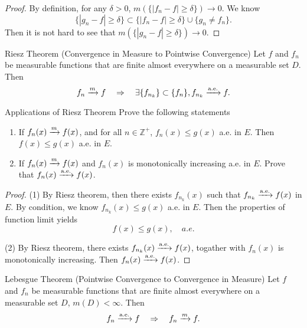 \begin{proof}
  By definition, for any $\delta > 0$, $m(\{|f_n - f| \geq \delta\}) \rightarrow 0$.
  We know
  \begin{equation}
    \{|g_n - f| \geq \delta \} \subset \{|f_n - f| \geq \delta\} \cup \{g_n \neq f_n\}.
  \end{equation}
  Then it is not hard to see that $m(\{|g_n - f| \geq \delta\}) \rightarrow 0$.
\end{proof}

\begin{theorem}{Riesz Theorem (Convergence in Measure to Pointwise Convergence)}{}
  Let $f$ and $f_n$ be measurable functions that are finite almost everywhere on
  a measurable set $D$. Then
  \begin{equation}
    f_n \xrightarrow{m} f \quad \Rightarrow \quad \exists \{f_{n_k}\} \subset \{f_n\}, f_{n_k} \xrightarrow{\text{a.e.}} f.
  \end{equation}
\end{theorem}

\begin{example}{Applications of Riesz Theorem}{}
  Prove the following statements
  \begin{enumerate}
  \item If $f_n(x) \xrightarrow{m} f(x)$, and for all $n \in \mathbb{Z}^+$, $f_n(x) \leq g(x)$ a.e. in $E$.
    Then $f(x) \leq g(x)$ a.e. in $E$.
  \item If $f_n(x) \xrightarrow{m} f(x)$ and $f_n(x)$ is monotonically increasing a.e. in $E$.
    Prove that $f_n(x) \xrightarrow{\text{a.e.}} f(x)$.
  \end{enumerate}
\end{example}

\begin{proof}
  (1) By Riesz theorem, then there exists $f_{n_k}(x)$ such that $f_{n_k} \xrightarrow{\text{a.e.}} f(x)$ in $E$.
  By condition, we know $f_{n_k}(x) \leq g(x)$ a.e. in $E$.
  Then the properties of function limit yields
  \begin{equation}
    f(x) \leq g(x), \quad a.e.
  \end{equation}

  (2) By Riesz theorem, there exists $f_{n_k}(x) \xrightarrow{\text{a.e.}} f(x)$,
  togather with $f_n(x)$ is monotonically increasing.
  Then $f_n(x) \xrightarrow{\text{a.e.}} f(x)$.
\end{proof}

\begin{theorem}{Lebesgue Theorem (Pointwise Convergence to Convergence in Measure)}{}
  Let $f$ and $f_n$ be measurable functions that are finite almost everywhere on
  a measurable set $D$, $m(D) < \infty$. Then
  \begin{equation}
    f_n \xrightarrow{\text{a.e.}} f \quad \Rightarrow \quad f_n \xrightarrow{m} f.
  \end{equation}
\end{theorem}

